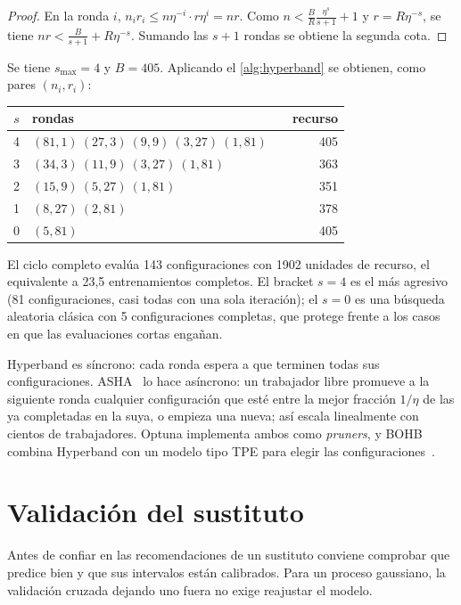 \begin{proof}
En la ronda $i$, $n_ir_i\le n\eta^{-i}\cdot r\eta^{i}=nr$. Como $n<\frac{B}{R}\frac{\eta^{s}}{s+1}+1$ y $r=R\eta^{-s}$, se tiene $nr<\frac{B}{s+1}+R\eta^{-s}$. Sumando las $s+1$ rondas se obtiene la segunda cota.
\end{proof}

\begin{ejemplo}[Brackets con $R=81$ y $\eta=3$]\label{ej:brackets}
Se tiene $s_{\max}=4$ y $B=405$. Aplicando el \cref{alg:hyperband} se obtienen, como pares $(n_i,r_i)$:
\begin{center}\small
\begin{tabular}{@{}cll r@{}}
\toprule
$s$ & rondas & & recurso \\
\midrule
4 & $(81,1)\ (27,3)\ (9,9)\ (3,27)\ (1,81)$ & & 405 \\
3 & $(34,3)\ (11,9)\ (3,27)\ (1,81)$ & & 363 \\
2 & $(15,9)\ (5,27)\ (1,81)$ & & 351 \\
1 & $(8,27)\ (2,81)$ & & 378 \\
0 & $(5,81)$ & & 405 \\
\bottomrule
\end{tabular}
\end{center}
El ciclo completo evalúa 143 configuraciones con 1902 unidades de recurso, el equivalente a 23,5 entrenamientos completos. El bracket $s=4$ es el más agresivo (81 configuraciones, casi todas con una sola iteración); el $s=0$ es una búsqueda aleatoria clásica con 5 configuraciones completas, que protege frente a los casos en que las evaluaciones cortas engañan.
\end{ejemplo}

Hyperband es síncrono: cada ronda espera a que terminen todas sus configuraciones. ASHA~\cite{asha} lo hace asíncrono: un trabajador libre promueve a la siguiente ronda cualquier configuración que esté entre la mejor fracción $1/\eta$ de las ya completadas en la suya, o empieza una nueva; así escala linealmente con cientos de trabajadores. Optuna implementa ambos como \emph{pruners}, y BOHB combina Hyperband con un modelo tipo TPE para elegir las configuraciones~\cite[§1.4.2]{feurer}.

\section{Validación del sustituto}

Antes de confiar en las recomendaciones de un sustituto conviene comprobar que predice bien y que sus intervalos están calibrados. Para un proceso gaussiano, la validación cruzada dejando uno fuera no exige reajustar el modelo.

